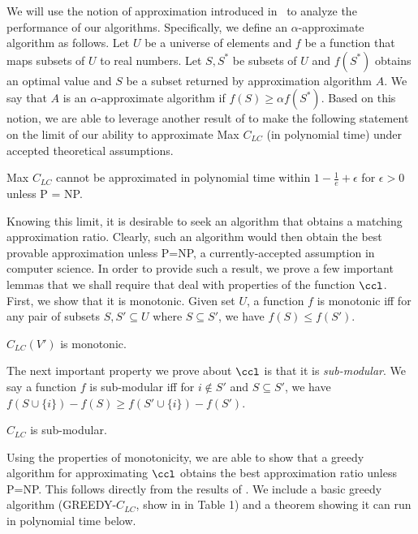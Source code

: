 We will use the notion of approximation introduced in~\cite{Garey79} to analyze the performance of our algorithms.  Specifically, we define an $\alpha$-approximate algorithm as follows.  Let $U$ be a universe of elements and $f$ be a function that maps subsets of $U$ to real numbers.  Let $S,S^*$ be subsets of $U$ and $f(S^*)$ obtains an optimal value and $S$ be a subset returned by approximation algorithm $A$. We say that $A$ is an $\alpha$-approximate algorithm if $f(S) \geq \alpha f(S^*)$.  Based on this notion, we are able to leverage another result of \cite{feige98} to make the following statement on the limit of our ability to approximate Max $C_{LC}$ (in polynomial time) under accepted theoretical assumptions.

\begin{thm}\label{approxUBound} Max $C_{LC}$ cannot be approximated in polynomial time within $1-\frac{1}{e} + \epsilon$ for $\epsilon > 0$ unless P = NP.\end{thm}

Knowing this limit, it is desirable to seek an algorithm that obtains a matching approximation ratio.  Clearly, such an algorithm would then obtain the best provable approximation unless P=NP, a currently-accepted assumption in computer science.  In order to provide such a result, we prove a few important lemmas that we shall require that deal with properties of the function $\ccl$.  First, we show that it is monotonic.  Given set $U$, a function $f$ is monotonic iff for any pair of subsets $S, S' \subseteq U$ where $S \subseteq S'$, we have $f(S) \leq f(S')$.

\begin{lemma}\label{mono} $C_{LC}(V')$ is monotonic.\end{lemma} 

The next important property we prove about $\ccl$ is that it is \textit{sub-modular}.  We say a function $f$ is sub-modular iff for $i \notin S'$ and $S \subseteq S'$, we have $f(S \cup\{i\}) - f(S) \geq f(S' \cup\{i\}) - f(S')$.

\begin{thm}\label{submod} $C_{LC}$ is sub-modular.\end{thm} 

Using the properties of monotonicity, we are able to show that a greedy algorithm for approximating $\ccl$ obtains the best approximation ratio unless P=NP.  This follows directly from the results of \cite{nemhauser78}.  We include a basic greedy algorithm (GREEDY-$C_{LC}$, show in in Table 1) and a theorem showing it can run in polynomial time below.\\

